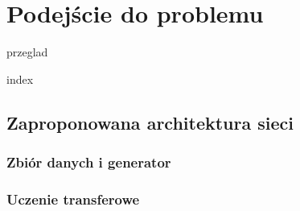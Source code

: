 \chapter{Podejście do problemu}

{przeglad}

{index}

\section{Zaproponowana architektura sieci}

\subsection{Zbiór danych i generator}

\subsection{Uczenie transferowe}
